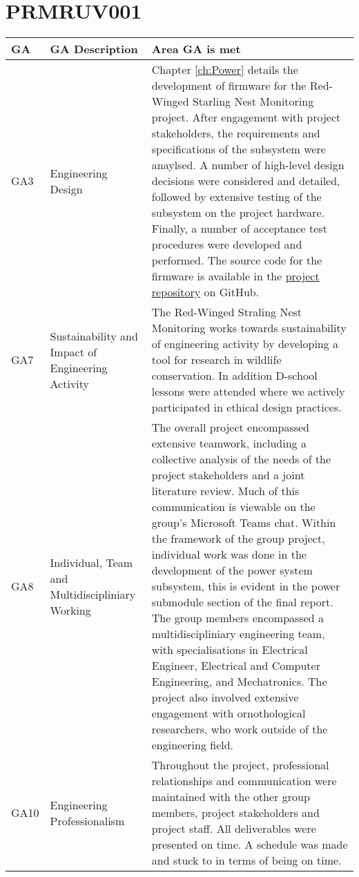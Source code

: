 \documentclass[class=report,11pt,crop=false]{standalone}
\begin{document}
\section{PRMRUV001}

\centering
\begin{tabularx}{\textwidth}{|p{} p{} X|}

    \hline
    \textbf{GA} & \textbf{GA Description} & \textbf{Area GA is met} \\ \hline

    GA3 & Engineering Design & Chapter \ref{ch:Power} details the development of firmware for the Red-Winged Starling Nest Monitoring project. After engagement with project stakeholders, the requirements and specifications of the subsystem were anaylsed. A number of high-level design decisions were considered and detailed, followed by extensive testing of the subsystem on the project hardware. Finally, a number of acceptance test procedures were developed and performed. The source code for the firmware is available in the \href{https://github.com/rothdu/EEE4113F-Group13-2024}{project repository} on GitHub. \\ \hline

    GA7 & Sustainability and Impact of Engineering Activity & The Red-Winged Straling Nest Monitoring works towards sustainability of engineering activity by developing a tool for research in wildlife conservation. In addition D-school lessons were attended where we actively participated in ethical design practices. \\ \hline

    GA8 & Individual, Team and Multidiscipliniary Working & The overall project encompassed extensive teamwork, including a collective analysis of the needs of the project stakeholders and a joint literature review. Much of this communication is viewable on the group's Microsoft Teams chat. Within the framework of the group project, individual work was done in the development of the power system subsystem, this is evident in the power submodule section of the final report. The group members encompassed a multidiscipliniary engineering team, with specialisations in Electrical Engineer, Electrical and Computer Engineering, and Mechatronics. The project also involved extensive engagement with ornothological researchers, who work outside of the engineering field. \\ \hline

    GA10 & Engineering Professionalism & Throughout the project, professional relationships and communication were maintained with the other group members, project stakeholders and project staff. All deliverables were presented on time. A schedule was made and stuck to in terms of being on time. \\ \hline


\end{tabularx}
\raggedright

\ifstandalone

\printnoidxglossary[type=\acronymtype,nonumberlist]
\fi
\end{document}
